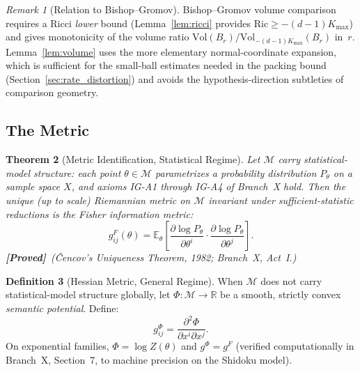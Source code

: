 \documentclass[11pt,a4paper]{article}
\newtheorem{theorem}{Theorem}[section]
\theoremstyle{definition}
\newtheorem{definition}[theorem]{Definition}
\theoremstyle{remark}
\newtheorem{remark}[theorem]{Remark}
\newcommand{\R}{\mathbb{R}}
\newcommand{\Ric}{\mathrm{Ric}}
\newcommand{\Vol}{\mathrm{Vol}}
\newcommand{\statusproved}{\textcolor{green!50!black}{\textbf{[Proved]}}}
\begin{document}
\begin{remark}[Relation to Bishop--Gromov]\label{rem:bishop_gromov}
Bishop--Gromov volume comparison requires a Ricci \emph{lower} 
bound (Lemma~\ref{lem:ricci} provides $\Ric \geq -(d-1)K_{\max}$) 
and gives monotonicity of the volume ratio 
$\Vol(B_r)/\Vol_{-(d-1)K_{\max}}(B_r)$ in~$r$. 
Lemma~\ref{lem:volume} uses the more elementary 
normal-coordinate expansion, which is sufficient for the 
small-ball estimates needed in the packing bound 
(Section~\ref{sec:rate_distortion}) and avoids the 
hypothesis-direction subtleties of comparison geometry.
\end{remark}

\subsection{The Metric}\label{sec:metric}

\begin{theorem}[Metric Identification, Statistical Regime]\label{thm:cencov}
Let $\mathcal{M}$ carry statistical-model structure: each point 
$\theta \in \mathcal{M}$ parametrizes a probability distribution 
$P_\theta$ on a sample space $X$, and axioms \textnormal{IG-A1} 
through \textnormal{IG-A4} of Branch~X hold. Then the unique 
(up to scale) Riemannian metric on $\mathcal{M}$ invariant under 
sufficient-statistic reductions is the Fisher information metric:
\begin{equation}\label{eq:fisher}
    g_{ij}^F(\theta) = \mathbb{E}_\theta\!\left[
    \frac{\partial \log P_\theta}{\partial \theta^i} \cdot 
    \frac{\partial \log P_\theta}{\partial \theta^j}\right].
\end{equation}
\statusproved\ (\v{C}encov's Uniqueness Theorem, 1982; 
Branch~X, Act~I.)
\end{theorem}

\begin{definition}[Hessian Metric, General Regime]\label{def:hessian}
When $\mathcal{M}$ does not carry statistical-model structure globally, 
let $\Phi : \mathcal{M} \to \R$ be a smooth, strictly convex 
\emph{semantic potential}. Define:
\begin{equation}\label{eq:hessian_metric}
    g_{ij}^\Phi = \frac{\partial^2 \Phi}{\partial x^i \partial x^j}.
\end{equation}
On exponential families, $\Phi = \log Z(\theta)$ and 
$g^\Phi = g^F$ (verified computationally in Branch~X, Section~7, 
to machine precision on the Shidoku model).
\end{definition}
\end{document}
